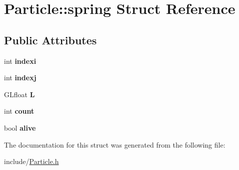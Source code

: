 \hypertarget{structParticle_1_1spring}{\section{Particle\-:\-:spring Struct Reference}
\label{structParticle_1_1spring}
}
\subsection*{Public Attributes}
\begin{DoxyCompactItemize}
\item 
\hypertarget{structParticle_1_1spring_a87a1c45bc8e6fda4fc24f973451d7374}{int {\bfseries indexi}}\label{structParticle_1_1spring_a87a1c45bc8e6fda4fc24f973451d7374}

\item 
\hypertarget{structParticle_1_1spring_a680b59e2d6ca1039267fc51b113c53a6}{int {\bfseries indexj}}\label{structParticle_1_1spring_a680b59e2d6ca1039267fc51b113c53a6}

\item 
\hypertarget{structParticle_1_1spring_a7bf4309301c1a087a79e7649ecd7185f}{G\-Lfloat {\bfseries L}}\label{structParticle_1_1spring_a7bf4309301c1a087a79e7649ecd7185f}

\item 
\hypertarget{structParticle_1_1spring_a9907abe5b485b2cead0fd23fd2d0d203}{int {\bfseries count}}\label{structParticle_1_1spring_a9907abe5b485b2cead0fd23fd2d0d203}

\item 
\hypertarget{structParticle_1_1spring_a35309948fe14fc48a7d428c75f6626e8}{bool {\bfseries alive}}\label{structParticle_1_1spring_a35309948fe14fc48a7d428c75f6626e8}

\end{DoxyCompactItemize}


The documentation for this struct was generated from the following file\-:\begin{DoxyCompactItemize}
\item 
include/\hyperlink{Particle_8h}{Particle.\-h}\end{DoxyCompactItemize}

